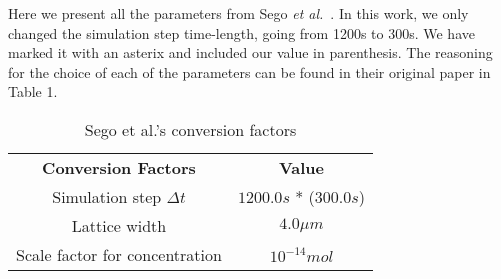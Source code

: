 Here we present all the parameters from Sego \textit{et al.}~\cite{sego_modular_2020}. In this work, we only changed the simulation step time-length, going from 1200s to 300s. We have marked it with an asterix and included our value in parenthesis. The reasoning for the choice of each of the parameters can be found in their original paper in Table 1.

\begin{table}[H] 
\caption{Sego et al.'s conversion factors\label{sup:table:sego_params:1}}
\centering
\begin{tabular}{cc}
\textbf{Conversion Factors}    & \textbf{Value}           \\
Simulation step $\Delta t$     & $1200.0 s$ *  ($300.0s$) \\
Lattice width                  & $4.0 \mu m$              \\
Scale factor for concentration & $10^{-14} mol$          \\

\end{tabular}
\end{table}

